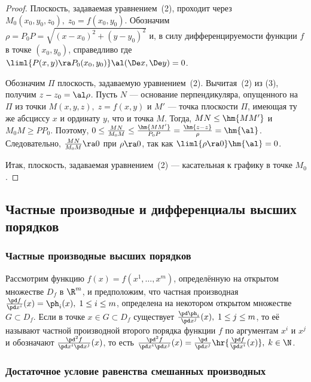 \documentclass[a4paper]{article}
\begin{document}
\begin{proof}
Плоскость, задаваемая уравнением~(2), проходит через
$M_0(x_0,y_0,z_0), \; z_0=f(x_0,y_0)$. Обозначим
$\rho=P_0P=\sqrt{(x-x_0)^2 + (y-y_0)^2}$ и, в силу
дифференцируемости функции $f$ в точке $(x_0,y_0)$, справедливо
 где $\liml{P(x,y)\ra P_0(x_0,y_0)} \al(\De
x,\De y)=0$.

Обозначим $\Pi$ плоскость, задаваемую уравнением~(2). Вычитая~(2) из
(3), получим $z-z_0=\al\rho$. Пусть $N$ --- основание
перпендикуляра, опущенного на $\Pi$ из точки $M(x,y,z), \; z=f(x,y)$
и $M'$ --- точка плоскости $\Pi$, имеющая ту же абсциссу $x$ и
ординату $y$, что и точка $M$. Тогда, $MN\le \hm{MM'}$ и $M_0M\ge
PP_0$. Поэтому, $0\le \frac{MN}{M_0M} \le \frac{\hm{MM'}}{P_0P} =
\frac{\hm{z-z}}{\rho}=\hm{\al}$. Следовательно,
$\frac{MN}{M_0M}\ra0$ при $\rho\ra0$, так как
$\liml{\rho\ra0}\hm{\al}=0$.

Итак, плоскость, задаваемая уравнением~(2) --- касательная к графику
в точке $M_0$.
\end{proof}

\subsection{ Частные производные и дифференциалы высших порядков}

\subsubsection{ Частные производные высших порядков}

Рассмотрим функцию $f(x)=f(x^1,\ldots,x^m)$, определённую на
открытом множестве $D_f$ в $\R^m$, и предположим, что частная
производная $\frac{\pd f}{\pd x^i}(x) = \ph_i(x), \; 1\le i \le m$,
определена на некотором открытом множестве $G\subset D_f$. Если в
точке $x\in G\subset D_f$ существует $\frac{\pd \ph_i}{\pd x^j}(x),
\; 1\le j \le m$, то её называют частной производной второго порядка
функции $f$ по аргументам $x^i$ и $x^j$ и обозначают $\frac{\pd^2
f}{\pd x^i \pd x^j}(x)$, то есть $\frac{\pd^2 f}{\pd x^i \pd x^j}(x)
= \frac{\pd}{\pd x^j}\hr{\frac{\pd f}{\pd x^i}(x)}, \; k\in\N$.

\subsubsection{ Достаточное условие равенства смешанных
производных}
\end{document}
